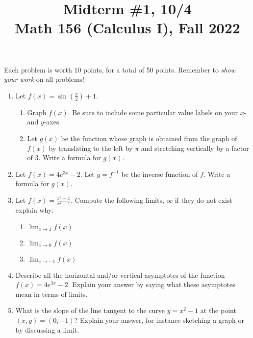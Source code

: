 \documentclass[11pt]{article}
\title{Midterm \#1, 10/4 \\ Math 156 (Calculus I), Fall 2022}
\date{}
\begin{document}
\maketitle

\thispagestyle{empty}

\vspace{-1cm}

Each problem is worth 10 points, for a total of 50 points. Remember to \emph{show your work} on all problems!

\begin{enumerate}
\item Let $f(x) = \sin(\frac{x}{2})+1$.
\begin{enumerate}
\item Graph $f(x)$. Be sure to include some particular value labels on your $x$- and $y$-axes.
\item Let $g(x)$ be the function whose graph is obtained from the graph of $f(x)$ by translating to the left by $\pi$ and stretching vertically by a factor of $3$. Write a formula for $g(x)$.
\end{enumerate}
\item Let $f(x)=4e^{3x} - 2$. Let $g=f^{-1}$ be the inverse function of $f$. Write a formula for $g(x)$.
\item Let $f(x) = \displaystyle \frac{x^2-x}{x^2-1}$. Compute the following limits, or if they do not exist explain why:
\begin{enumerate}
\item $\displaystyle \lim_{x \to 1} f(x)$
\item $\displaystyle \lim_{x \to 0} f(x)$
\item $\displaystyle \lim_{x \to -1} f(x)$
\end{enumerate}
\item Describe all the horizontal and/or vertical asymptotes of the function $f(x)=4e^{3x} - 2$. Explain your answer by saying what these asymptotes mean in terms of limits.
\item What is the slope of the line tangent to the curve $y=x^2-1$ at the point $(x,y)=(0,-1)$? Explain your answer, for instance sketching a graph or by discussing a limit.
\end{enumerate}
\end{document}
